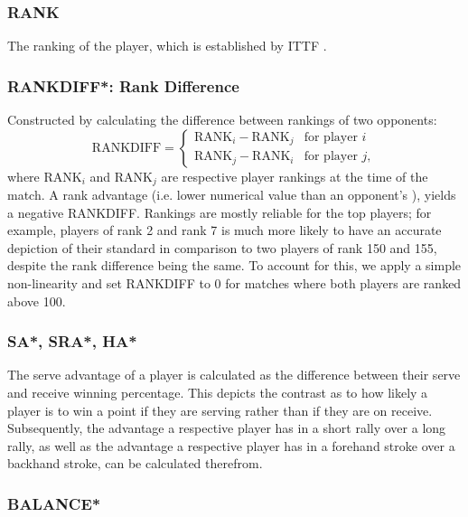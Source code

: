 \subsubsection*{RANK} \label{sec:rank}
The ranking of the player, which is established by ITTF \cite{ITTF}.

\subsubsection*{RANKDIFF*: Rank Difference} \label{sec:rankdiff}
Constructed by calculating the difference between rankings of two opponents:
\begin{equation}
    \text{RANKDIFF} = \begin{cases}
\text{RANK}_i - \text{RANK}_j &\text{for player $i$} \\
\text{RANK}_j - \text{RANK}_i &\text{for player $j$},
\end{cases}
\end{equation}
where RANK$_i$ and RANK$_j$ are respective player rankings at the time of the match. A rank advantage (i.e. lower numerical value than an opponent's ), yields a negative RANKDIFF. Rankings are mostly reliable for the top players; for example, players of rank 2 and rank 7 is much more likely to have an accurate depiction of their standard in comparison to two players of rank 150 and 155, despite the rank difference being the same. To account for this, we apply a simple non-linearity and set RANKDIFF to $0$ for matches where both players are ranked above 100.%


\subsubsection*{SA*, SRA*, HA*} \label{sec:advantage}
The serve advantage of a player is calculated as the difference between their serve and receive winning percentage. This depicts the contrast as to how likely a player is to win a point if they are serving rather than if they are on receive. Subsequently, the advantage a respective player has in a short rally over a long rally, as well as the advantage a respective player has in a forehand stroke over a backhand stroke, can be calculated therefrom.

\subsubsection*{BALANCE*} \label{sec:balance}

